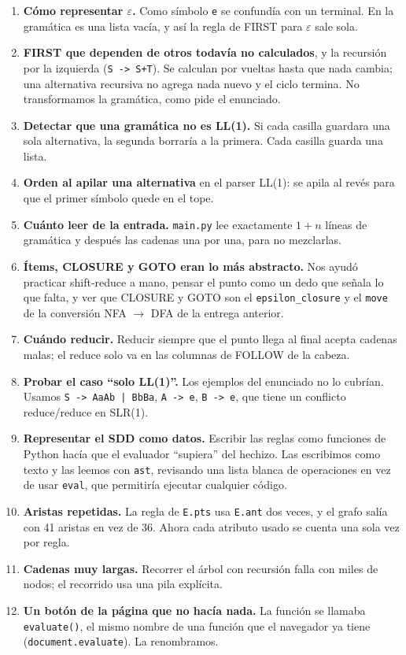 \documentclass[11pt,a4paper]{article}
\newcommand{\code}[1]{\texttt{#1}}
\begin{document}
\begin{enumerate}
  \item \textbf{Cómo representar $\varepsilon$.} Como símbolo \code{e} se confundía con un terminal. En la gramática es una lista vacía, y así la regla de FIRST para $\varepsilon$ sale sola.
  \item \textbf{FIRST que dependen de otros todavía no calculados}, y la recursión por la izquierda (\code{S -> S+T}). Se calculan por vueltas hasta que nada cambia; una alternativa recursiva no agrega nada nuevo y el ciclo termina. No transformamos la gramática, como pide el enunciado.
  \item \textbf{Detectar que una gramática no es LL(1).} Si cada casilla guardara una sola alternativa, la segunda borraría a la primera. Cada casilla guarda una lista.
  \item \textbf{Orden al apilar una alternativa} en el parser LL(1): se apila al revés para que el primer símbolo quede en el tope.
  \item \textbf{Cuánto leer de la entrada.} \code{main.py} lee exactamente $1+n$ líneas de gramática y después las cadenas una por una, para no mezclarlas.
  \item \textbf{Ítems, CLOSURE y GOTO eran lo más abstracto.} Nos ayudó practicar shift-reduce a mano, pensar el punto como un dedo que señala lo que falta, y ver que CLOSURE y GOTO son el \code{epsilon\_closure} y el \code{move} de la conversión NFA $\to$ DFA de la entrega anterior.
  \item \textbf{Cuándo reducir.} Reducir siempre que el punto llega al final acepta cadenas malas; el reduce solo va en las columnas de FOLLOW de la cabeza.
  \item \textbf{Probar el caso ``solo LL(1)''.} Los ejemplos del enunciado no lo cubrían. Usamos \code{S -> AaAb | BbBa}, \code{A -> e}, \code{B -> e}, que tiene un conflicto reduce/reduce en SLR(1).
  \item \textbf{Representar el SDD como datos.} Escribir las reglas como funciones de Python hacía que el evaluador ``supiera'' del hechizo. Las escribimos como texto y las leemos con \code{ast}, revisando una lista blanca de operaciones en vez de usar \code{eval}, que permitiría ejecutar cualquier código.
  \item \textbf{Aristas repetidas.} La regla de \code{E.pts} usa \code{E.ant} dos veces, y el grafo salía con 41 aristas en vez de 36. Ahora cada atributo usado se cuenta una sola vez por regla.
  \item \textbf{Cadenas muy largas.} Recorrer el árbol con recursión falla con miles de nodos; el recorrido usa una pila explícita.
  \item \textbf{Un botón de la página que no hacía nada.} La función se llamaba \code{evaluate()}, el mismo nombre de una función que el navegador ya tiene (\code{document.evaluate}). La renombramos.
\end{enumerate}
\end{document}
